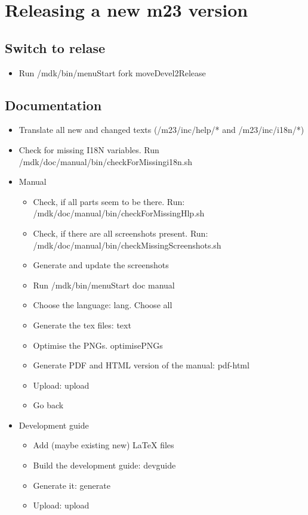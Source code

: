 \section{Releasing a new m23 version}

\subsection{Switch to relase}
\begin{itemize}
	\item Run /mdk/bin/menuStart \Rightarrow fork \Rightarrow moveDevel2Release
\end{itemize}


\subsection{Documentation}
\begin{itemize}
	\item Translate all new and changed texts (/m23/inc/help/* and /m23/inc/i18n/*)
	\item Check for missing I18N variables. Run /mdk/doc/manual/bin/checkForMissingi18n.sh
	\item Manual
	\begin{itemize}
		\item Check, if all parts seem to be there. Run: /mdk/doc/manual/bin/checkForMissingHlp.sh
		\item Check, if there are all screenshots present. Run: /mdk/doc/manual/bin/checkMissingScreenshots.sh
		\item Generate and update the screenshots
		\item Run /mdk/bin/menuStart \Rightarrow doc \Rightarrow manual
		\item Choose the language: \Rightarrow lang. Choose all
		\item Generate the tex files: \Rightarrow text
		\item Optimise the PNGs. \Rightarrow optimisePNGs
		\item Generate PDF and HTML version of the manual: \Rightarrow pdf-html
		\item Upload: \Rightarrow upload
		\item Go back
	\end{itemize}
	\item Development guide
	\begin{itemize}
		\item Add (maybe existing new) LaTeX files
		\item Build the development guide: \Rightarrow devguide
		\item Generate it: \Rightarrow generate
		\item Upload: \Rightarrow upload
	\end{itemize}
\end{itemize}



